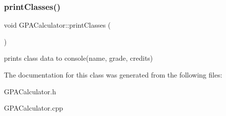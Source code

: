 \subsubsection{\texorpdfstring{print\+Classes()}{printClasses()}}
{\footnotesize\ttfamily void G\+P\+A\+Calculator\+::print\+Classes (\begin{DoxyParamCaption}{ }\end{DoxyParamCaption})}



prints class data to console(name, grade, credits) 



The documentation for this class was generated from the following files\+:\begin{DoxyCompactItemize}
\item 
G\+P\+A\+Calculator.\+h\item 
G\+P\+A\+Calculator.\+cpp\end{DoxyCompactItemize}

